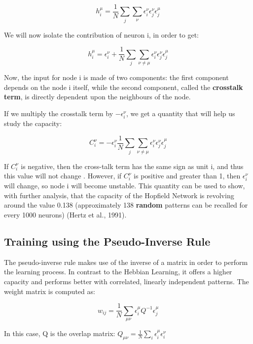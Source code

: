 \[ h_{i}^{\mu} = \frac{1}{N}\sum_{j} \sum_{\nu} \epsilon_{i}^{\nu}
						 \epsilon_{j}^{\nu}
						 \epsilon_{j}^{\mu}\]
 
 We will now isolate the contribution of neuron i, in order to get:
 
\[ h_{i}^{\mu} = \epsilon_{i}^{\nu} + \frac{1}{N}\sum_{j} \sum_{\nu\neq\mu} 			 					 \epsilon_{i}^{\nu}
						 \epsilon_{j}^{\nu}
						 \epsilon_{j}^{\mu}\]
 
 Now, the input for node i is made of two components: the first component depends on the node i itself, while the second component, called the \textbf{crosstalk term}, is directly dependent upon the neighbours of the node. 
 
 If we multiply the crosstalk term by \(-\epsilon_{i}^{\nu}\),  we get a quantity that will help us study the capacity:
 
 \[ C_{i}^{\nu}= -\epsilon_{i}^{\nu} \frac{1}{N}\sum_{j} \sum_{\nu\neq\mu} 			 			\epsilon_{i}^{\nu}
		       		 \epsilon_{j}^{\nu}
				 \epsilon_{j}^{\mu}\]
 
 If \( C_{i}^{\nu} \) is negative, then the cross-talk term has the same sign as unit i, and thus this value will not change \cite{lectureslides}. However, if \( C_{i}^{\nu} \) is positive and greater than 1, then \( \epsilon_{i}^{\nu}\) will change, so node i will become unstable. This quantity can be used to show, with further analysis, that the capacity of the Hopfield Network is revolving around the value 0.138 (approximately 138 \textbf{random} patterns can be recalled for every 1000 neurons) (Hertz et al., 1991).
 
 
\subsection{Training using the Pseudo-Inverse Rule}

The pseudo-inverse rule makes use of the inverse of a matrix in order to perform the learning process. In contrast to the Hebbian Learning, it offers a higher capacity and performs better with correlated, linearly independent patterns. The weight matrix is computed as:

\[ w_{ij} = \frac{1}{N} \sum_{\mu\nu}\epsilon_{i}^\mu Q^{-1} \epsilon_{j}^\mu \]

In this case, Q is the overlap matrix:
\(  Q_{\mu\nu} = \frac{1}{N}\sum_{i}\epsilon_{i}^\mu \epsilon_{i}^\nu \)

